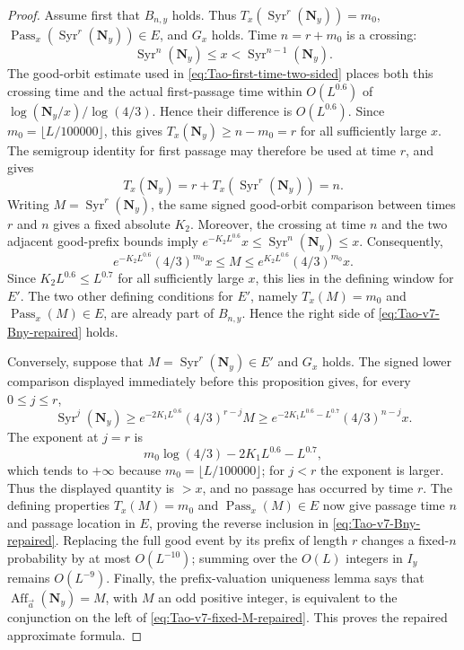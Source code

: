\begin{proof}
Assume first that \(B_{n,y}\) holds.  Thus
\(T_x(\operatorname{Syr}^{r}(\mathbf N_y))=m_0\),
\(\operatorname{Pass}_x(\operatorname{Syr}^{r}(\mathbf N_y))\in E\), and
\(G_x\) holds.  Time \(n=r+m_0\) is a crossing:
\[
 \operatorname{Syr}^{n}(\mathbf N_y)\leq x
 <\operatorname{Syr}^{n-1}(\mathbf N_y).
\]
The good-orbit estimate used in
\eqref{eq:Tao-first-time-two-sided} places both this crossing time and the
actual first-passage time within \(O(L^{0.6})\) of
\(\log(\mathbf N_y/x)/\log(4/3)\).  Hence their difference is
\(O(L^{0.6})\).  Since
\(m_0=\lfloor L/100000\rfloor\), this gives
\(T_x(\mathbf N_y)\geq n-m_0=r\) for all sufficiently large \(x\).  The
semigroup identity for first passage may therefore be used at time \(r\),
and gives
\[
 T_x(\mathbf N_y)
 =r+T_x(\operatorname{Syr}^{r}(\mathbf N_y))=n.
\]
Writing \(M=\operatorname{Syr}^{r}(\mathbf N_y)\), the same signed
good-orbit comparison between times \(r\) and \(n\) gives a fixed absolute
\(K_2\).  Moreover, the crossing at time \(n\) and the two adjacent
good-prefix bounds imply
\(e^{-K_2L^{0.6}}x\leq\operatorname{Syr}^n(\mathbf N_y)
\leq x\).  Consequently,
\[
 e^{-K_2L^{0.6}}(4/3)^{m_0}x
 \leq M\leq
 e^{K_2L^{0.6}}(4/3)^{m_0}x.
\]
Since \(K_2L^{0.6}\leq L^{0.7}\) for all sufficiently large \(x\), this
lies in the defining window for \(E'\).  The two other defining conditions
for \(E'\), namely
\(T_x(M)=m_0\) and \(\operatorname{Pass}_x(M)\in E\), are already part of
\(B_{n,y}\).  Hence the right side of
\eqref{eq:Tao-v7-Bny-repaired} holds.

Conversely, suppose that
\(M=\operatorname{Syr}^{r}(\mathbf N_y)\in E'\) and \(G_x\) holds.  The
signed lower comparison displayed immediately before this proposition gives,
for every \(0\leq j\leq r\),
\[
 \operatorname{Syr}^{j}(\mathbf N_y)
 \geq e^{-2K_1L^{0.6}}(4/3)^{r-j}M
 \geq e^{-2K_1L^{0.6}-L^{0.7}}
       (4/3)^{n-j}x.
\]
The exponent at \(j=r\) is
\[
 m_0\log(4/3)-2K_1L^{0.6}-L^{0.7},
\]
which tends to \(+\infty\) because
\(m_0=\lfloor L/100000\rfloor\); for \(j<r\) the exponent is larger.
Thus the displayed quantity is \(>x\), and no passage has occurred by
time \(r\).  The defining properties \(T_x(M)=m_0\) and
\(\operatorname{Pass}_x(M)\in E\) now give passage time \(n\) and passage
location in \(E\), proving the reverse inclusion in
\eqref{eq:Tao-v7-Bny-repaired}.  Replacing the full good event by its prefix
of length \(r\) changes a fixed-\(n\) probability by at most
\(O(L^{-10})\); summing over the \(O(L)\) integers in \(I_y\) remains
\(O(L^{-9})\).  Finally, the prefix-valuation uniqueness lemma says that
\(\operatorname{Aff}_{\vec a}(\mathbf N_y)=M\), with \(M\) an odd positive
integer, is equivalent to the conjunction on the left of
\eqref{eq:Tao-v7-fixed-M-repaired}.  This proves the repaired approximate
formula.


\end{proof}
